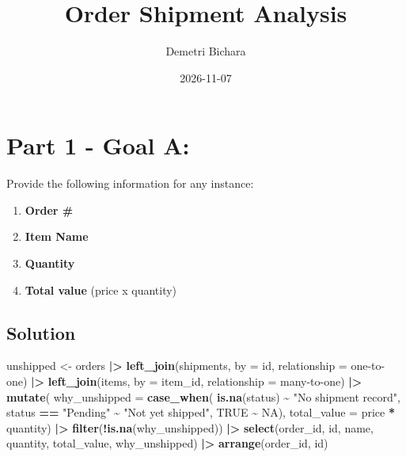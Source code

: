 \documentclass[
]{article}
\title{Order Shipment Analysis}
\author{Demetri Bichara}
\date{2026-11-07}
\newenvironment{Shaded}{\begin{snugshade}}{\end{snugshade}}
\newcommand{\AttributeTok}[1]{\textcolor[rgb]{0.13,0.29,0.53}{#1}}
\newcommand{\ConstantTok}[1]{\textcolor[rgb]{0.56,0.35,0.01}{#1}}
\newcommand{\FunctionTok}[1]{\textcolor[rgb]{0.13,0.29,0.53}{\textbf{#1}}}
\newcommand{\NormalTok}[1]{#1}
\newcommand{\OtherTok}[1]{\textcolor[rgb]{0.56,0.35,0.01}{#1}}
\newcommand{\SpecialCharTok}[1]{\textcolor[rgb]{0.81,0.36,0.00}{\textbf{#1}}}
\newcommand{\StringTok}[1]{\textcolor[rgb]{0.31,0.60,0.02}{#1}}
\providecommand{\tightlist}{%
  \setlength{\itemsep}{0pt}\setlength{\parskip}{0pt}}
\begin{document}
\maketitle

{
\setcounter{tocdepth}{2}
\tableofcontents
}
\section{Part 1 - Goal A:}\label{part-1---goal-a}

Provide the following information for any instance:

\begin{enumerate}
\def\labelenumi{\arabic{enumi}.}
\tightlist
\item
  \textbf{Order \#}
\item
  \textbf{Item Name}
\item
  \textbf{Quantity}
\item
  \textbf{Total value} (price x quantity)
\end{enumerate}

\subsection{Solution}\label{p1ASolution}

\begin{Shaded}
\begin{Highlighting}[]
\NormalTok{unshipped }\OtherTok{\textless{}{-}}\NormalTok{ orders }\SpecialCharTok{|\textgreater{}}
  \FunctionTok{left\_join}\NormalTok{(shipments, }\AttributeTok{by =} \StringTok{\textquotesingle{}id\textquotesingle{}}\NormalTok{, }\AttributeTok{relationship =} \StringTok{\textquotesingle{}one{-}to{-}one\textquotesingle{}}\NormalTok{) }\SpecialCharTok{|\textgreater{}}
  \FunctionTok{left\_join}\NormalTok{(items, }\AttributeTok{by =} \StringTok{\textquotesingle{}item\_id\textquotesingle{}}\NormalTok{, }\AttributeTok{relationship =} \StringTok{\textquotesingle{}many{-}to{-}one\textquotesingle{}}\NormalTok{) }\SpecialCharTok{|\textgreater{}}
  \FunctionTok{mutate}\NormalTok{(}
    \AttributeTok{why\_unshipped =} \FunctionTok{case\_when}\NormalTok{(}
      \FunctionTok{is.na}\NormalTok{(status) }\SpecialCharTok{\textasciitilde{}} \StringTok{"No shipment record"}\NormalTok{, }
\NormalTok{      status }\SpecialCharTok{==} \StringTok{"Pending"} \SpecialCharTok{\textasciitilde{}} \StringTok{"Not yet shipped"}\NormalTok{,}
      \ConstantTok{TRUE} \SpecialCharTok{\textasciitilde{}} \ConstantTok{NA}\NormalTok{), }
    \AttributeTok{total\_value =}\NormalTok{ price }\SpecialCharTok{*}\NormalTok{ quantity) }\SpecialCharTok{|\textgreater{}} 
  \FunctionTok{filter}\NormalTok{(}\SpecialCharTok{!}\FunctionTok{is.na}\NormalTok{(why\_unshipped)) }\SpecialCharTok{|\textgreater{}}
  \FunctionTok{select}\NormalTok{(order\_id, id, name, quantity, total\_value, why\_unshipped) }\SpecialCharTok{|\textgreater{}} 
  \FunctionTok{arrange}\NormalTok{(order\_id, id) }
\end{Highlighting}
\end{Shaded}
\end{document}
